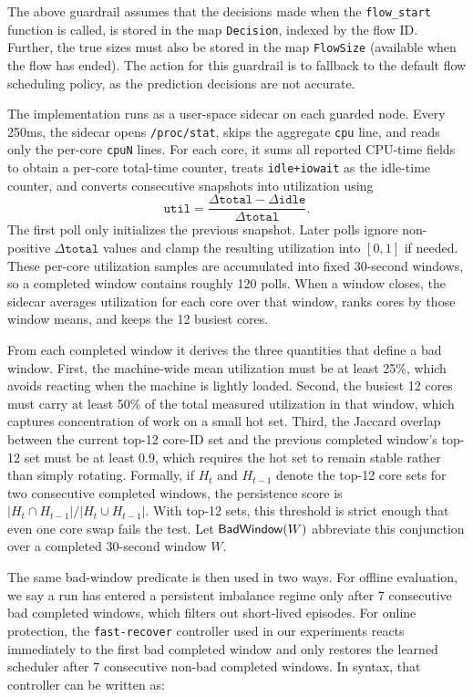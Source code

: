 The above guardrail assumes that the decisions made when the {\tt flow_start} function is called, is stored in the map {\tt Decision}, indexed by the flow ID. Further, the true sizes must also be stored in the map {\tt FlowSize} (available when the flow has ended).
The action for this guardrail is to fallback to the default flow scheduling policy, as the prediction decisions are not accurate.



The implementation runs as a user-space sidecar on each guarded node. Every 250ms, the sidecar opens \texttt{/proc/stat}, skips the aggregate \texttt{cpu} line, and reads only the per-core \texttt{cpuN} lines. For each core, it sums all reported CPU-time fields to obtain a per-core total-time counter, treats \texttt{idle+iowait} as the idle-time counter, and converts consecutive snapshots into utilization using
\[
\texttt{util} = \frac{\Delta \texttt{total} - \Delta \texttt{idle}}{\Delta \texttt{total}}.
\]
The first poll only initializes the previous snapshot. Later polls ignore non-positive \(\Delta \texttt{total}\) values and clamp the resulting utilization into \([0,1]\) if needed. These per-core utilization samples are accumulated into fixed 30-second windows, so a completed window contains roughly 120 polls. When a window closes, the sidecar averages utilization for each core over that window, ranks cores by those window means, and keeps the 12 busiest cores.



From each completed window it derives the three quantities that define a bad window. First, the machine-wide mean utilization must be at least 25\%, which avoids reacting when the machine is lightly loaded. Second, the busiest 12 cores must carry at least 50\% of the total measured utilization in that window, which captures concentration of work on a small hot set. Third, the Jaccard overlap between the current top-12 core-ID set and the previous completed window's top-12 set must be at least 0.9, which requires the hot set to remain stable rather than simply rotating. Formally, if \(H_t\) and \(H_{t-1}\) denote the top-12 core sets for two consecutive completed windows, the persistence score is \(|H_t \cap H_{t-1}| / |H_t \cup H_{t-1}|\). With top-12 sets, this threshold is strict enough that even one core swap fails the test. Let ${\sf BadWindow}(W)$ abbreviate this conjunction over a completed 30-second window \(W\).

The same bad-window predicate is then used in two ways. For offline evaluation, we say a run has entered a persistent imbalance regime only after 7 consecutive bad completed windows, which filters out short-lived episodes. For online protection, the \texttt{fast-recover} controller used in our experiments reacts immediately to the first bad completed window and only restores the learned scheduler after 7 consecutive non-bad completed windows. In \lang syntax, that controller can be written as:

